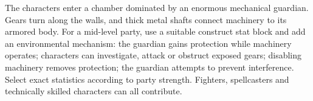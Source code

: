 The characters enter a chamber dominated by an enormous mechanical guardian. Gears turn along the walls, and thick metal shafts connect machinery to its armored body. For a mid-level party, use a suitable construct stat block and add an environmental mechanism: the guardian gains protection while machinery operates; characters can investigate, attack or obstruct exposed gears; disabling machinery removes protection; the guardian attempts to prevent interference. Select exact statistics according to party strength. Fighters, spellcasters and technically skilled characters can all contribute.
